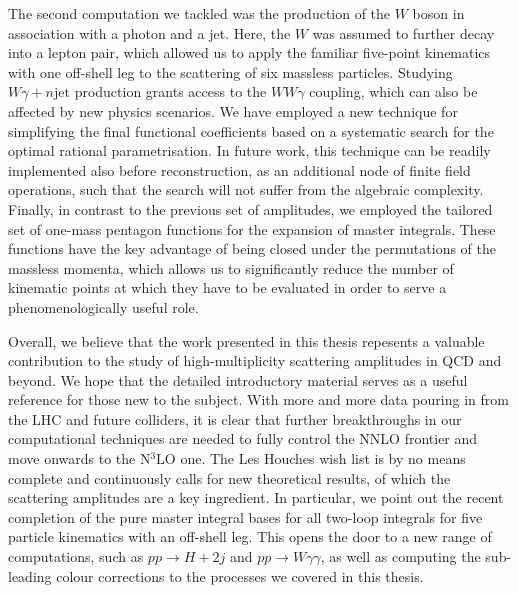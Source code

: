 \documentclass[main.tex]{subfiles}
\begin{document}
The second computation we tackled was the production of the $W$ boson in association with a photon and a jet. Here, the $W$ was assumed to further decay into a lepton pair, which allowed us to apply the familiar five-point kinematics with one off-shell leg to the scattering of six massless particles. Studying $W\gamma + n \text{jet}$ production grants access to the $W W \gamma$ coupling, which can also be affected by new physics scenarios. We have employed a new technique for simplifying the final functional coefficients based on a systematic search for the optimal rational parametrisation. In future work, this technique can be readily implemented also before reconstruction, as an additional node of finite field operations, such that the search will not suffer from the algebraic complexity. Finally, in contrast to the previous set of amplitudes, we employed the tailored set of one-mass pentagon functions for the expansion of master integrals. These functions have the key advantage of being closed under the permutations of the massless momenta, which allows us to significantly reduce the number of kinematic points at which they have to be evaluated in order to serve a phenomenologically useful role.

Overall, we believe that the work presented in this thesis repesents a valuable contribution to the study of high-multiplicity scattering amplitudes in QCD and beyond. We hope that the detailed introductory material serves as a useful reference for those new to the subject. With more and more data pouring in from the LHC and future colliders, it is clear that further breakthroughs in our computational techniques are needed to fully control the NNLO frontier and move onwards to the N$^3$LO one. The Les Houches wish list is by no means complete and continuously calls for new theoretical results, of which the scattering amplitudes are a key ingredient. In particular, we point out the recent completion of the pure master integral bases for all two-loop integrals for five particle kinematics with an off-shell leg. This opens the door to a new range of computations, such as $pp \rightarrow H+2j$ and $pp \rightarrow W \gamma \gamma $, as well as computing the sub-leading colour corrections to the processes we covered in this thesis.
\end{document}
